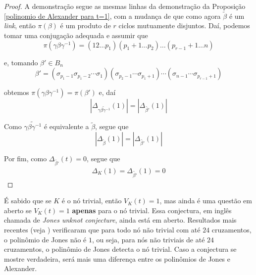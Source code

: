 	\begin{proof}
		A demonstração segue as mesmas linhas da demonstração da Proposição \eqref{polinomio de Alexander para t=1}, com a mudança de que como agora $\widetilde{\beta}$ é um \textit{link}, então $\pi(\beta)$ é um produto de $r$ ciclos mutuamente disjuntos. Daí, podemos tomar uma conjugação adequada e assumir que 
		\begin{equation*}
		\pi(\gamma\beta\gamma^{-1}) = (12\dots p_1)(p_1+1\dots p_2)\dots(p_{r-1}+1\dots n)
		\end{equation*}
		\par\vspace{0.3cm} e, tomando $\beta'\in B_n$
		\begin{equation*}
		\beta' = (\sigma_{p_1-1}\sigma_{p_1-2}\cdots\sigma_1)(\sigma_{p_2-1}\cdots\sigma_{p_1+1})\cdots( \sigma_{n-1}\cdots\sigma_{p_{r-1} + 1} )
		\end{equation*}
		\par\vspace{0.3cm} obtemos $\pi(\gamma\beta\gamma^{-1}) = \pi(\beta')$ e, daí
		\begin{equation*}
		|\Delta_{\widetilde{\gamma\beta\gamma^{-1}}}(1)| = | \Delta_{\widetilde{\beta'}}(1) |
		\end{equation*}
		\par\vspace{0.3cm} Como $\widetilde{\gamma\beta\gamma^{-1}}$ é equivalente a $\widetilde{\beta}$, segue que
		\begin{equation*}
		|\Delta_{\widetilde{\beta}}(1)| = | \Delta_{\widetilde{\beta'}}(1) |
		\end{equation*} 
		\par\vspace{0.3cm} Por fim, como $\Delta_{\widetilde{\beta'}}(t) = 0$, segue que
		\begin{align*}
		\Delta_K(1) = \Delta_{\widetilde{\beta'}}(1) = 0
		\end{align*} 
	\end{proof}
	\par\vspace{0.3cm} É sabido que se $K$ é o nó trivial, então $V_K(t) = 1$, mas ainda é uma questão em aberto se $V_K(t) = 1$ \textbf{apenas} para o nó trivial. Essa conjectura, em inglês chamada de \textit{Jones unknot conjecture}, ainda está em aberto. Resultados mais recentes (veja \cite{Jones-detecta-no-trivial-1,Jones-detecta-no-trivial-2}) verificaram que para todo nó não trivial com até $24$ cruzamentos, o polinômio de Jones não é $1$, ou seja, para nós não triviais de até $24$ cruzamentos, o polinômio de Jones detecta o nó trivial. Caso a conjectura se mostre verdadeira, será mais uma diferença entre os polinômios de Jones e Alexander.
